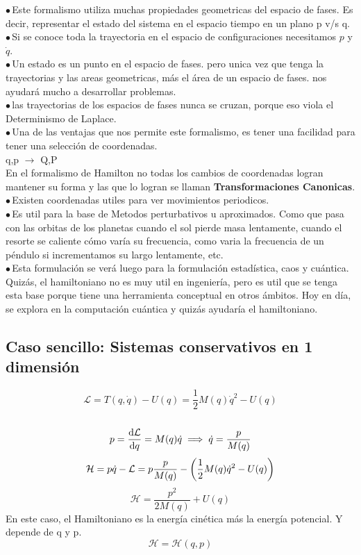 \documentclass[12pt]{article}
\newcommand{\en}[1]{\[\boxed{#1}\]}
\renewcommand{\ss}[1]{\subsection{#1}}
\newcommand{\pua}{$\bullet \, $}
\begin{document}
\pua Este formalismo utiliza muchas propiedades geometricas del espacio de fases. Es decir, representar el estado del sistema en el espacio tiempo en un plano p  v/s  q.\\
\pua Si se conoce toda la trayectoria en el espacio de configuraciones necesitamos $p$ y $\dot{q}$.\\
\pua Un estado es un punto en el espacio de fases. pero unica vez que tenga la trayectorias y las areas geometricas, más el área de un espacio de fases. nos ayudará mucho a desarrollar problemas.\\
\pua las trayectorias de los espacios de fases nunca se cruzan, porque eso viola el Determinismo de Laplace.\\
\pua Una de las ventajas que nos permite este formalismo, es tener una facilidad para tener una selección de coordenadas.\\
q,p $\rightarrow$ Q,P\\
En el formalismo de Hamilton no todas los cambios de coordenadas logran mantener su forma y las que lo logran se llaman \textbf{Transformaciones Canonicas}.\\
\pua Existen coordenadas utiles para ver movimientos periodicos.\\
\pua Es util para la base de Metodos perturbativos u aproximados. Como que pasa con las orbitas de los planetas cuando el sol pierde masa lentamente, cuando el resorte se caliente cómo varía su frecuencia, como varia la frecuencia de un péndulo si incrementamos su largo lentamente, etc.\\
\pua Esta formulación se verá luego para la formulación estadística, caos y cuántica.\\
Quizás, el hamiltoniano no es muy util en ingeniería, pero es util que se tenga esta base porque tiene una herramienta conceptual en otros ámbitos. Hoy en día, se explora en la computación cuántica y quizás ayudaría el hamiltoniano.\\


\ss{Caso sencillo: Sistemas conservativos en 1 dimensión}
$$\mathcal{L} = T(q,\dot{q})-U(q)= \frac{1}{2}M(q)\dot{q}^2 - U(q)$$\\
$$p= \dv{\mathcal{L}}{q}= M(q)\dot{q} \implies \dot{q} = \frac{p}{M(q)}$$ 
$$\mathcal{H}= p \dot{q}- \mathcal{L} = p \frac{p}{M(q)} - \qty(\frac{1}{2}M(q)\dot{q}^2 - U(q))$$
\en{\mathcal{H}= \frac{p^2}{2M(q)} + U(q)}
En este caso, el Hamiltoniano es la energía cinética más la energía potencial. Y depende de q y p.
$$\mathcal{H}= \mathcal{H}(q,p)$$
\end{document}
